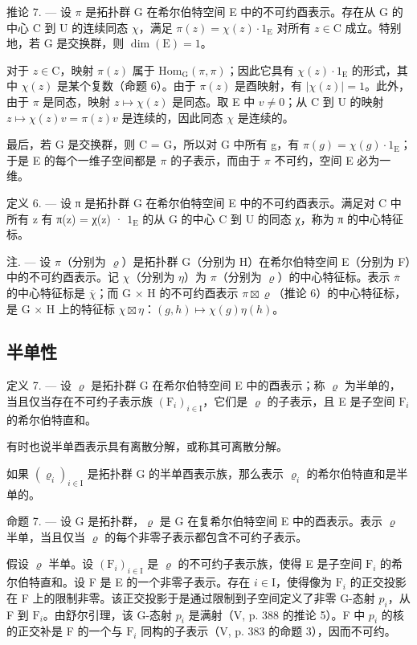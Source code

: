 推论 7. --- 设 \(\pi\) 是拓扑群 G 在希尔伯特空间 E 中的不可约酉表示。存在从 G 的中心 C 到 U 的连续同态 \(\chi\)，满足 \(\pi(z) = \chi(z) \cdot 1_{\mathrm{E}}\) 对所有 \(z \in \mathrm{C}\) 成立。特别地，若 G 是交换群，则 \(\dim(\mathrm{E}) = 1\)。

对于 \(z \in \mathrm{C}\)，映射 \(\pi(z)\) 属于 \(\mathrm{Hom}_{\mathrm{G}}(\pi, \pi)\)；因此它具有 \(\chi(z) \cdot 1_{\mathrm{E}}\) 的形式，其中 \(\chi(z)\) 是某个复数（命题 6）。由于 \(\pi(z)\) 是酉映射，有 \(|\chi(z)| = 1\)。此外，由于 \(\pi\) 是同态，映射 \(z \mapsto \chi(z)\) 是同态。取 E 中 \(v \neq 0\)；从 C 到 U 的映射 \(z \mapsto \chi(z)v = \pi(z)v\) 是连续的，因此同态 \(\chi\) 是连续的。

最后，若 G 是交换群，则 C = G，所以对 G 中所有 g，有 \(\pi(g) = \chi(g) \cdot 1_{\mathrm{E}}\)；于是 E 的每个一维子空间都是 \(\pi\) 的子表示，而由于 \(\pi\) 不可约，空间 E 必为一维。

定义 6. --- 设 π 是拓扑群 G 在希尔伯特空间 E 中的不可约酉表示。满足对 C 中所有 z 有 π(z) = χ(z) · \(1_{\mathrm{E}}\) 的从 G 的中心 C 到 U 的同态 χ，称为 π 的中心特征标。

注. --- 设 \(\pi\)（分别为 \(\varrho\)）是拓扑群 G（分别为 H）在希尔伯特空间 E（分别为 F）中的不可约酉表示。记 \(\chi\)（分别为 \(\eta\)）为 \(\pi\)（分别为 \(\varrho\)）的中心特征标。表示 \(\overline{\pi}\) 的中心特征标是 \(\overline{\chi}\)；而 G × H 的不可约酉表示 \(\pi \boxtimes \varrho\)（推论 6）的中心特征标，是 G × H 上的特征标 \(\chi \boxtimes \eta\)：\((g, h) \mapsto \chi(g)\eta(h)\)。

\subsection{半单性}

定义 7. --- 设 \(\varrho\) 是拓扑群 G 在希尔伯特空间 E 中的酉表示；称 \(\varrho\) 为半单的，当且仅当存在不可约子表示族 \((\mathrm{F}_i)_{i\in \mathrm{I}}\)，它们是 \(\varrho\) 的子表示，且 E 是子空间 \(\mathrm{F}_i\) 的希尔伯特直和。

有时也说半单酉表示具有离散分解，或称其可离散分解。

如果 \((\varrho_{i})_{i\in\mathrm{I}}\) 是拓扑群 G 的半单酉表示族，那么表示 \(\varrho_{i}\) 的希尔伯特直和是半单的。

命题 7. --- 设 G 是拓扑群，\(\varrho\) 是 G 在复希尔伯特空间 E 中的酉表示。表示 \(\varrho\) 半单，当且仅当 \(\varrho\) 的每个非零子表示都包含不可约子表示。

假设 \(\varrho\) 半单。设 \((\mathrm{F}_i)_{i\in \mathrm{I}}\) 是 \(\varrho\) 的不可约子表示族，使得 E 是子空间 \(\mathrm{F}_i\) 的希尔伯特直和。设 F 是 E 的一个非零子表示。存在 \(i\in \mathrm{I}\)，使得像为 \(\mathrm{F}_i\) 的正交投影在 F 上的限制非零。该正交投影于是通过限制到子空间定义了非零 G-态射 \(p_i\)，从 F 到 \(\mathrm{F}_i\)。由舒尔引理，该 G-态射 \(p_i\) 是满射（V, p. 388 的推论 5）。F 中 \(p_i\) 的核的正交补是 F 的一个与 \(\mathrm{F}_i\) 同构的子表示（V, p. 383 的命题 3），因而不可约。

